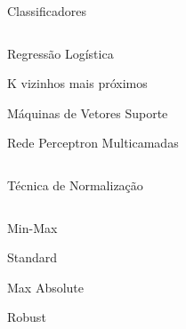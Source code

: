 \documentclass[notes,11pt, aspectratio=169]{beamer}
\newenvironment{wideitemize}{\itemize\addtolength{\itemsep}{10pt}}{\enditemize}
\begin{document}
\begin{frame}{Classificadores}
\begin{columns}[T] %
	\begin{column}{.38\textwidth}
		\begin{wideitemize}
			\item Regressão Logística
			\item K vizinhos mais próximos
			\item Máquinas de Vetores Suporte
			\item Rede Perceptron Multicamadas
		\end{wideitemize}
	\end{column}%
	\hfill%
	\begin{column}{.58\textwidth}
	\end{column}%
\end{columns}
\end{frame}

\begin{frame}{Técnica de Normalização}
\begin{columns}[T] %
	\begin{column}{.38\textwidth}
		\begin{wideitemize}
			\item Min-Max
			\item Standard
			\item Max Absolute
			\item Robust
		\end{wideitemize}
	\end{column}%
	\hfill%
	\begin{column}{.58\textwidth}
	\end{column}%
\end{columns}
\end{frame}
\end{document}
